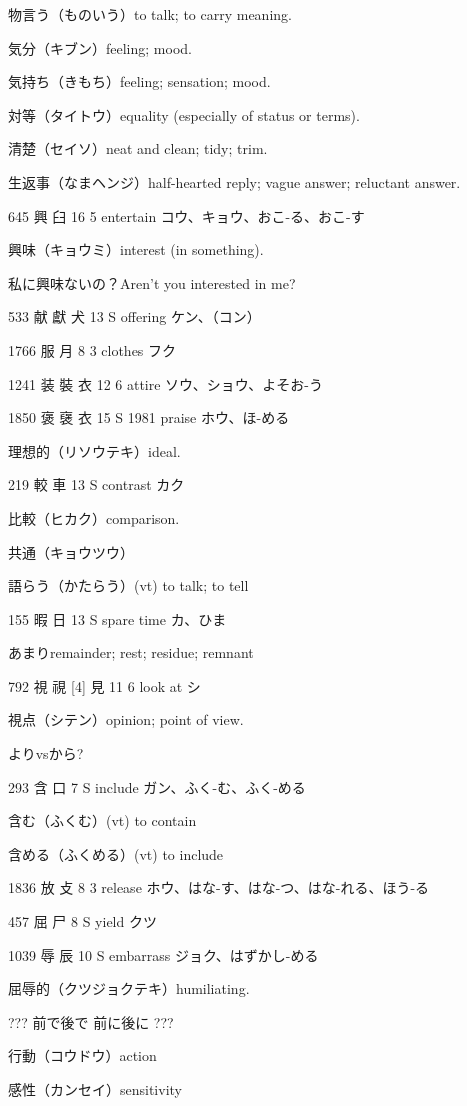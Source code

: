 物言う（ものいう）to talk; to carry meaning.

気分（キブン）feeling; mood.

気持ち（きもち）feeling; sensation; mood.

対等（タイトウ）equality (especially of status or terms).

清楚（セイソ）neat and clean; tidy; trim.

生返事（なまヘンジ）half-hearted reply; vague answer; reluctant answer.

645	興		臼	16	5		entertain	コウ、キョウ、おこ-る、おこ-す

興味（キョウミ）interest (in something).

私に興味ないの？Aren't you interested in me?

533	献	獻	犬	13	S		offering	ケン、（コン）

1766	服		月	8	3		clothes	フク

1241	装	裝	衣	12	6		attire	ソウ、ショウ、よそお-う

1850	褒	襃	衣	15	S	1981	praise	ホウ、ほ-める

理想的（リソウテキ）ideal.

219	較		車	13	S		contrast	カク

比較（ヒカク）comparison.

共通（キョウツウ）

語らう（かたらう）(vt) to talk; to tell

155	暇		日	13	S		spare time	カ、ひま

あまりremainder; rest; residue; remnant

792	視	視 [4]	見	11	6		look at	シ

視点（シテン）opinion; point of view.

よりvsから?

293	含		口	7	S		include	ガン、ふく-む、ふく-める

含む（ふくむ）(vt) to contain

含める（ふくめる）(vt) to include

1836	放		攴	8	3		release	ホウ、はな-す、はな-つ、はな-れる、ほう-る

457	屈		尸	8	S		yield	クツ

1039	辱		辰	10	S		embarrass	ジョク、はずかし-める

屈辱的（クツジョクテキ）humiliating.

???
前で後で
前に後に
???

行動（コウドウ）action

感性（カンセイ）sensitivity

